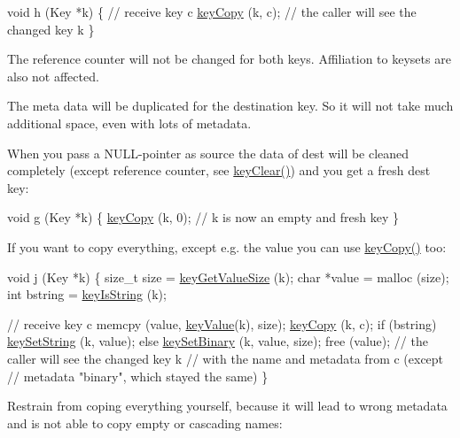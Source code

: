 \begin{DoxyCodeInclude}
\textcolor{keywordtype}{void} h (Key *k)
\{
        \textcolor{comment}{// receive key c}
        \hyperlink{group__key_ga6a12cbbe656a1ad9f41b8c681d7a2f92}{keyCopy} (k, c);
        \textcolor{comment}{// the caller will see the changed key k}
\}
\end{DoxyCodeInclude}
 The reference counter will not be changed for both keys. Affiliation to keysets are also not affected.

The meta data will be duplicated for the destination key. So it will not take much additional space, even with lots of metadata.

When you pass a N\-U\-L\-L-\/pointer as source the data of dest will be cleaned completely (except reference counter, see \hyperlink{group__key_gab2242311a36bbc0520e0d36895107ec1}{key\-Clear()}) and you get a fresh dest key\-:


\begin{DoxyCodeInclude}
\textcolor{keywordtype}{void} g (Key *k)
\{
        \hyperlink{group__key_ga6a12cbbe656a1ad9f41b8c681d7a2f92}{keyCopy} (k, 0);
        \textcolor{comment}{// k is now an empty and fresh key}
\}
\end{DoxyCodeInclude}
 If you want to copy everything, except e.\-g. the value you can use \hyperlink{group__key_ga6a12cbbe656a1ad9f41b8c681d7a2f92}{key\-Copy()} too\-:


\begin{DoxyCodeInclude}
\textcolor{keywordtype}{void} j (Key *k)
\{
        \textcolor{keywordtype}{size\_t} size = \hyperlink{group__keyvalue_gae326672fffb7474abfe9baf53b73217e}{keyGetValueSize} (k);
        \textcolor{keywordtype}{char} *value = malloc (size);
        \textcolor{keywordtype}{int} bstring = \hyperlink{group__keytest_gaea7670778abd07fee0fe8ac12a149190}{keyIsString} (k);

        \textcolor{comment}{// receive key c}
        memcpy (value, \hyperlink{group__keyvalue_ga6f29609c5da53c6dc26a98678d5752af}{keyValue}(k), size);
        \hyperlink{group__key_ga6a12cbbe656a1ad9f41b8c681d7a2f92}{keyCopy} (k, c);
        \textcolor{keywordflow}{if} (bstring) \hyperlink{group__keyvalue_ga622bde1eb0e0c4994728331326340ef2}{keySetString} (k, value);
        \textcolor{keywordflow}{else} \hyperlink{group__keyvalue_gaa50a5358fd328d373a45f395fa1b99e7}{keySetBinary} (k, value, size);
        free (value);
        \textcolor{comment}{// the caller will see the changed key k}
        \textcolor{comment}{// with the name and metadata from c (except}
        \textcolor{comment}{// metadata "binary", which stayed the same)}
\}
\end{DoxyCodeInclude}
 Restrain from coping everything yourself, because it will lead to wrong metadata and is not able to copy empty or cascading names\-:


